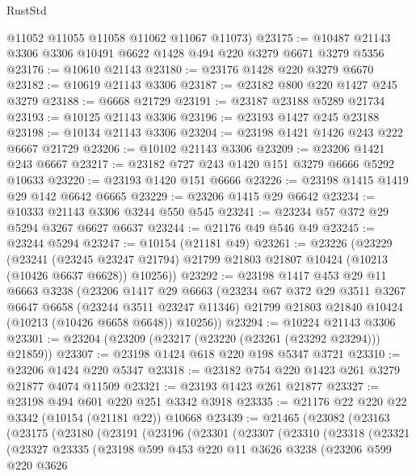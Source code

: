 \begin{lexlean}{RustStd}
\begin{coremodule}
      @11052
      @11055
      @11058
      @11062
      @11067
      @11073)
@23175 := @10487 @21143 @3306 @3306 @10491 @6622 @1428 @494 @220 @3279 @6671 @3279 @5356
@23176 := @10610 @21143
@23180 := @23176 @1428 @220 @3279 @6670
@23182 := @10619 @21143 @3306
@23187 := @23182 @800 @220 @1427 @245 @3279
@23188 := @6668 @21729
@23191 := @23187 @23188 @5289 @21734
@23193 := @10125 @21143 @3306
@23196 := @23193 @1427 @245 @23188
@23198 := @10134 @21143 @3306
@23204 := @23198 @1421 @1426 @243 @222 @6667 @21729
@23206 := @10102 @21143 @3306
@23209 := @23206 @1421 @243 @6667
@23217 := @23182 @727 @243 @1420 @151 @3279 @6666 @5292 @10633
@23220 := @23193 @1420 @151 @6666
@23226 := @23198 @1415 @1419 @29 @142 @6642 @6665
@23229 := @23206 @1415 @29 @6642
@23234 := @10333 @21143 @3306 @3244 @550 @545
@23241 := @23234 @57 @372 @29 @5294 @3267 @6627 @6637
@23244 := @21176 @49 @546 @49
@23245 := @23244 @5294
@23247 := @10154 (@21181 @49)
@23261 := @23226
    (@23229
      (@23241
        (@23245 @23247 @21794)
        @21799
        @21803
        @21807
        @10424
        (@10213 (@10426 @6637 @6628))
        @10256))
@23292 := @23198
    @1417
    @453
    @29
    @11
    @6663
    @3238
    (@23206
      @1417
      @29
      @6663
      (@23234
        @67
        @372
        @29
        @3511
        @3267
        @6647
        @6658
        (@23244 @3511 @23247 @11346)
        @21799
        @21803
        @21840
        @10424
        (@10213 (@10426 @6658 @6648))
        @10256))
@23294 := @10224 @21143 @3306
@23301 := @23204 (@23209 (@23217 (@23220 (@23261 (@23292 @23294))) @21859))
@23307 := @23198 @1424 @618 @220 @198 @5347 @3721
@23310 := @23206 @1424 @220 @5347
@23318 := @23182 @754 @220 @1423 @261 @3279 @21877 @4074 @11509
@23321 := @23193 @1423 @261 @21877
@23327 := @23198 @494 @601 @220 @251 @3342 @3918
@23335 := @21176 @22 @220 @22 @3342 (@10154 (@21181 @22)) @10668
@23439 := @21465
    (@23082
      (@23163
        (@23175
          (@23180
            (@23191
              (@23196
                (@23301
                  (@23307
                    (@23310
                      (@23318
                        (@23321
                          (@23327
                            @23335
                            (@23198
                              @599
                              @453
                              @220
                              @11
                              @3626
                              @3238
                              (@23206
                                @599
                                @220
                                @3626

\end{coremodule}
\end{lexlean}
